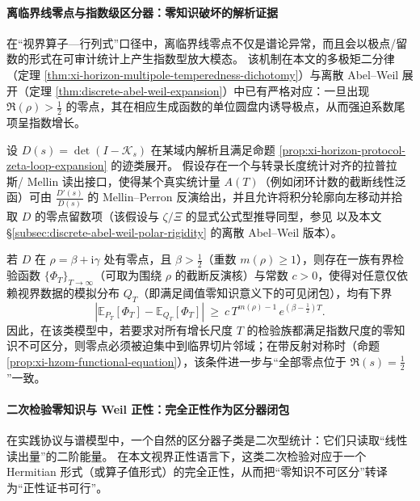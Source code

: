 \paragraph{离临界线零点与指数级区分器：零知识破坏的解析证据}
在“视界算子—行列式”口径中，离临界线零点不仅是谱论异常，而且会以极点/留数的形式在可审计统计上产生指数型放大模态。
该机制在本文的多极矩二分律（定理 \ref{thm:xi-horizon-multipole-temperedness-dichotomy}）与离散 Abel--Weil 展开（定理 \ref{thm:discrete-abel-weil-expansion}）中已有严格对应：一旦出现 \(\Re(\rho)>\tfrac12\) 的零点，其在相应生成函数的单位圆盘内诱导极点，从而强迫系数尾项呈指数增长。

\begin{proposition}\label{prop:xi-hzom-offcritical-zero-distinguisher}
设 \(D(s)=\det(I-\mathcal{K}_s)\) 在某域内解析且满足命题 \ref{prop:xi-horizon-protocol-zeta-loop-expansion} 的迹类展开。
假设存在一个与转录长度统计对齐的拉普拉斯/ Mellin 读出接口，使得某个真实统计量 \(A(T)\)（例如闭环计数的截断线性泛函）可由 \(\frac{D'(s)}{D(s)}\) 的 Mellin--Perron 反演给出，并且允许将积分轮廓向左移动并拾取 \(D\) 的零点留数项（该假设与 \(\zeta/\Xi\) 的显式公式型推导同型，参见 \cite{Connes1999TraceFormulaNCG} 以及本文 \S\ref{subsec:discrete-abel-weil-polar-rigidity} 的离散 Abel--Weil 版本）。
\par
若 \(D\) 在 \(\rho=\beta+\mathrm{i}\gamma\) 处有零点，且 \(\beta>\tfrac12\)（重数 \(m(\rho)\ge 1\)），则存在一族有界检验函数 \(\{\Phi_T\}_{T\to\infty}\)（可取为围绕 \(\rho\) 的截断反演核）与常数 \(c>0\)，使得对任意仅依赖视界数据的模拟分布 \(Q_T\)（即满足阈值零知识意义下的可见闭包），均有下界
\[
\left|\mathbb{E}_{P_T}[\Phi_T]-\mathbb{E}_{Q_T}[\Phi_T]\right|
\ \ge\
c\,T^{m(\rho)-1}\,e^{(\beta-\frac12)T}.
\]
因此，在该类模型中，若要求对所有增长尺度 \(T\) 的检验族都满足指数尺度的零知识不可区分，则零点必须被迫集中到临界切片邻域；在带反射对称时（命题 \ref{prop:xi-hzom-functional-equation}），该条件进一步与“全部零点位于 \(\Re(s)=\tfrac12\)”一致。
\end{proposition}

\paragraph{二次检验零知识与 Weil 正性：完全正性作为区分器闭包}
在实践协议与谱模型中，一个自然的区分器子类是二次型统计：它们只读取“线性读出量”的二阶能量。
在本文视界正性语言下，这类二次检验对应于一个 Hermitian 形式（或算子值形式）的完全正性，从而把“零知识不可区分”转译为“正性证书可行”。

